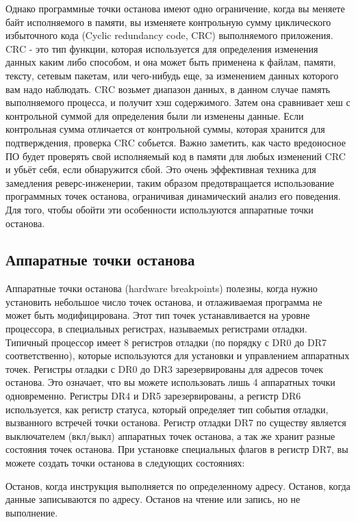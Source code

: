 \documentclass[12pt]{book}
\begin{document}
Однако программные точки останова имеют одно ограничение, когда вы меняете байт исполняемого в памяти, вы изменяете контрольную сумму циклического избыточного кода (Cyclic redundancy code, CRC) выполняемого приложения. CRC - это тип функции, которая используется для определения изменения данных каким либо способом, и она может быть применена к файлам, памяти, тексту, сетевым пакетам, или чего-нибудь еще, за изменением данных которого вам надо наблюдать. CRC возьмет диапазон данных, в данном случае память выполняемого процесса, и получит хэш содержимого. Затем она сравнивает хеш с контрольной суммой для определения были ли изменены данные. Если контрольная сумма отличается от контрольной суммы, которая хранится для подтверждения, проверка CRC собьется. Важно заметить, как часто вредоносное ПО будет проверять свой исполняемый код в памяти для любых изменений CRC и убьёт себя, если обнаружится сбой. Это очень эффективная техника для замедления реверс-инженерии, таким образом предотвращается использование программных точек останова, ограничивая динамический анализ его поведения. Для того, чтобы обойти эти особенности используются аппаратные точки останова.

\subsection{Аппаратные точки останова}

Аппаратные точки останова (hardware breakpoints) полезны, когда нужно установить небольшое число точек останова, и отлаживаемая программа не может быть модифицирована. Этот тип точек устанавливается на уровне процессора, в специальных регистрах, называемых регистрами отладки. Типичный процессор имеет 8 регистров отладки (по порядку с DR0 до DR7 соответственно), которые используются для установки и управлением аппаратных точек. Регистры отладки с DR0 до DR3 зарезервированы для адресов точек останова. Это означает, что вы можете использовать лишь 4 аппаратных точки одновременно. Регистры DR4 и DR5 зарезервированы, а регистр DR6 используется, как регистр статуса, который определяет тип события отладки, вызванного встречей точки останова. Регистр отладки DR7 по существу является выключателем (вкл/выкл) аппаратных точек останова, а так же хранит разные состояния точек останова. При установке специальных флагов в регистр DR7, вы можете создать точки останова в следующих состояниях:

     Останов, когда инструкция выполняется по определенному адресу.
     Останов, когда данные записываются по адресу.
     Останов на чтение или запись, но не выполнение.
\end{document}
